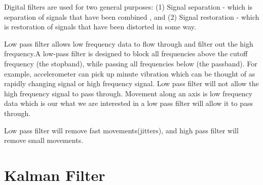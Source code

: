 \documentclass{article}
\begin{document}
Digital filters are used for two general purposes: (1) Signal separation - which is separation of signals that have been combined , and (2) Signal restoration - which is restoration of signals that have been distorted in some way. 

Low pass filter allows low frequency data to flow through and filter out the high frequency.A low-pass filter is designed to block all frequencies above the
cutoff frequency (the stopband), while passing all frequencies below (the
passband). For example, accelerometer can pick up minute vibration which can be thought of as rapidly changing signal or high frequency signal. Low pass filter will not allow the high frequency signal to pass through. Movement along an axis is low frequency data which is our what we are interested in a low pass filter will allow it to pass through.

Low pass filter will remove fast movements(jitters), and high pass filter will remove small movements.

\section{Kalman Filter}



\end{document}
